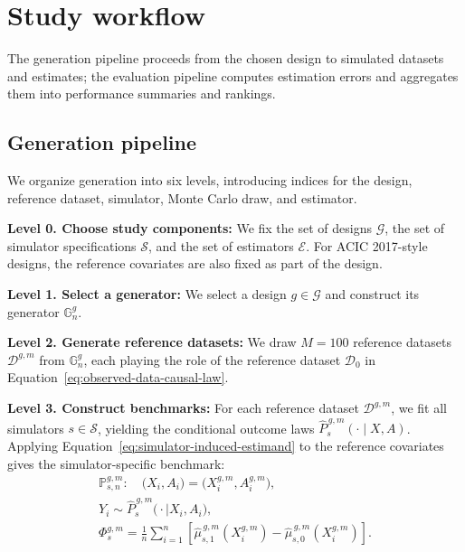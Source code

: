 \section{Study workflow}
\label{sec:benchmarking-procedure}

The generation pipeline proceeds from the chosen design to simulated datasets and estimates; the evaluation pipeline computes estimation errors and aggregates them into performance summaries and rankings.

\subsection{Generation pipeline}

We organize generation into six levels, introducing indices for the design, reference dataset, simulator, Monte Carlo draw, and estimator.

\medskip
\noindent\textbf{Level 0. Choose study components:} We fix the set of designs \(\mathcal G\), the set of simulator specifications \(\mathcal S\), and the set of estimators \(\mathcal E\). For ACIC 2017-style designs, the reference covariates are also fixed as part of the design.

\medskip
\noindent\textbf{Level 1. Select a generator:} We select a design \(g\in\mathcal G\) and construct its generator \(\mathbb G_n^{g}\).

\medskip
\noindent\textbf{Level 2. Generate reference datasets:} We draw \(M=100\) reference datasets \(\mathcal D^{g,m}\) from \(\mathbb G_n^{g}\), each playing the role of the reference dataset \(\mathcal D_0\) in Equation~\eqref{eq:observed-data-causal-law}.

\medskip
\noindent\textbf{Level 3. Construct benchmarks:} For each reference dataset \(\mathcal D^{g,m}\), we fit all simulators \(s\in\mathcal S\), yielding the conditional outcome laws \(\widehat P_s^{\,g,m}(\cdot\mid X,A)\). Applying Equation~\eqref{eq:simulator-induced-estimand} to the reference covariates gives the simulator-specific benchmark:
\begin{equation}
\begin{gathered}
\mathbb P_{s,n}^{g,m}:\quad
\bigl(X_i,A_i\bigr)
=\bigl(X_i^{g,m},A_i^{g,m}\bigr),\\
Y_i\sim\widehat P_s^{\,g,m}\bigl(\cdot\mid X_i,A_i\bigr),\\
\Phi_s^{g,m}
=
\frac1n
\sum_{i=1}^n
\left[
\widehat\mu_{s,1}^{\,g,m}(X_i^{g,m})
-
\widehat\mu_{s,0}^{\,g,m}(X_i^{g,m})
\right].
\end{gathered}
\label{eq:simulator-specific-benchmark}
\end{equation}

